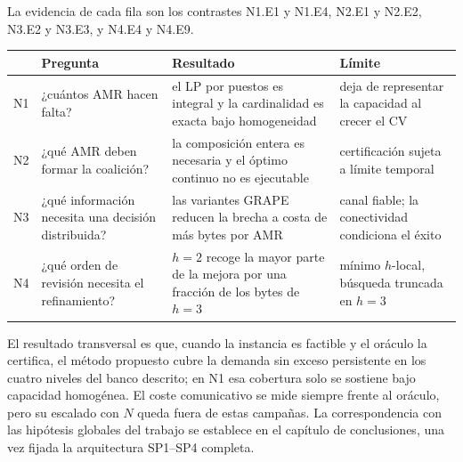 {\scriptsize
La evidencia de cada fila son los contrastes N1.E1 y N1.E4, N2.E1 y N2.E2,
N3.E2 y N3.E3, y N4.E4 y N4.E9.\par\smallskip
\renewcommand{\arraystretch}{1.0}
\setlength{\tabcolsep}{4pt}
\begin{tabularx}{\linewidth}{@{}l>{\raggedright\arraybackslash}X
>{\raggedright\arraybackslash}X>{\raggedright\arraybackslash}X@{}}
\toprule
&\textbf{Pregunta}&\textbf{Resultado}&\textbf{Límite}\\
\midrule
N1&¿cuántos AMR hacen falta?&el LP por puestos es integral y la cardinalidad es
exacta bajo homogeneidad&deja de representar la capacidad al crecer el CV\\
N2&¿qué AMR deben formar la coalición?&la composición entera es necesaria y el
óptimo continuo no es ejecutable&certificación sujeta a límite temporal\\
N3&¿qué información necesita una decisión distribuida?&las variantes GRAPE
reducen la brecha a costa de más bytes por AMR&canal fiable; la conectividad
condiciona el éxito\\
N4&¿qué orden de revisión necesita el refinamiento?&$h=2$ recoge la mayor parte
de la mejora por una fracción de los bytes de $h=3$&mínimo $h$-local, búsqueda
truncada en $h=3$\\
\bottomrule
\end{tabularx}
\par\smallskip
El resultado transversal es que, cuando la instancia es factible y el oráculo la
certifica, el método propuesto cubre la demanda sin exceso persistente en los
cuatro niveles del banco descrito; en N1 esa cobertura solo se sostiene bajo
capacidad homogénea. El coste comunicativo se mide siempre frente al oráculo,
pero su escalado con $N$ queda fuera de estas campañas. La correspondencia con
las hipótesis globales del trabajo se establece en el capítulo de conclusiones,
una vez fijada la arquitectura SP1--SP4 completa.
}





